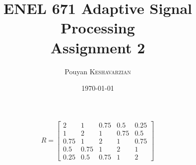 \documentclass{article}
\title{ ENEL 671 Adaptive Signal Processing\\ Assignment 2 } %
\author{
          Pouyan    \textsc{Keshavarzian} \\} %
\date{\today} %
\begin{document}
\maketitle %

\begin{center}
  \[
  R=
    \begin{bmatrix}
      2 & 1 & 0.75 & 0.5 & 0.25 \\
      1 & 2 & 1 & 0.75 & 0.5 \\
      0.75 & 1 & 2 & 1 & 0.75 \\
      0.5 & 0.75 & 1 & 2 & 1 \\
      0.25 & 0.5 & 0.75 & 1 & 2
    \end{bmatrix}
  \]
\end{center}
\end{document}
